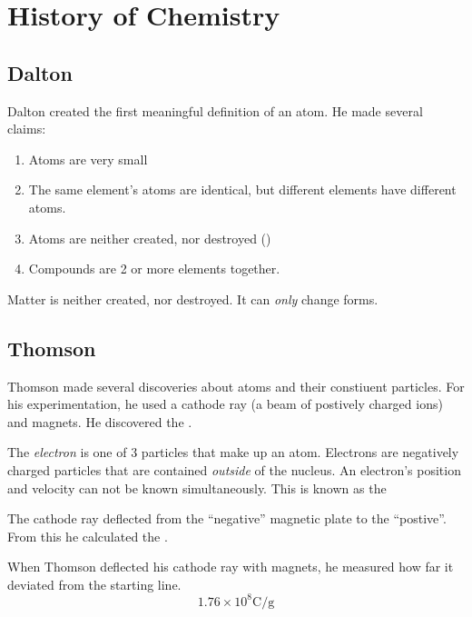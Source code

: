 \section{History of Chemistry} \label{sec:History of Chemistry}
\subsection{Dalton} \label{subsec:Dalton}
Dalton created the first meaningful definition of an atom.
He made several claims:
\begin{enumerate}
\item Atoms are very small
\item The same element's atoms are identical, but different elements have different atoms.
\item Atoms are neither created, nor destroyed ()
\item Compounds are 2 or more elements together.
\end{enumerate}

\begin{definition} \label{def:Law of Conservation of Matter}
  Matter is neither created, nor destroyed.
  It can \emph{only} change forms.
\end{definition}

\subsection{Thomson} \label{subsec:Thomson}
Thomson made several discoveries about atoms and their constiuent particles.
For his experimentation, he used a cathode ray (a beam of postively charged ions) and magnets.
He discovered the .

\begin{definition}[Electron] \label{def:Electron}
  The \emph{electron} is one of 3 particles that make up an atom.
  Electrons are negatively charged particles that are contained \emph{outside} of the nucleus.
  An electron's position and velocity can not be known simultaneously.
  This is known as the 
\end{definition}
The cathode ray deflected from the ``negative'' magnetic plate to the ``postive''.
From this he calculated the .

\begin{definition} \label{def:Magnetic Deflection}
  When Thomson deflected his cathode ray with magnets, he measured how far it deviated from the starting line.
  \begin{equation} \label{eq:Magnetic Deflection}
    1.76 \times 10^{8} \si{\coulomb / \gram}
  \end{equation}
\end{definition}
